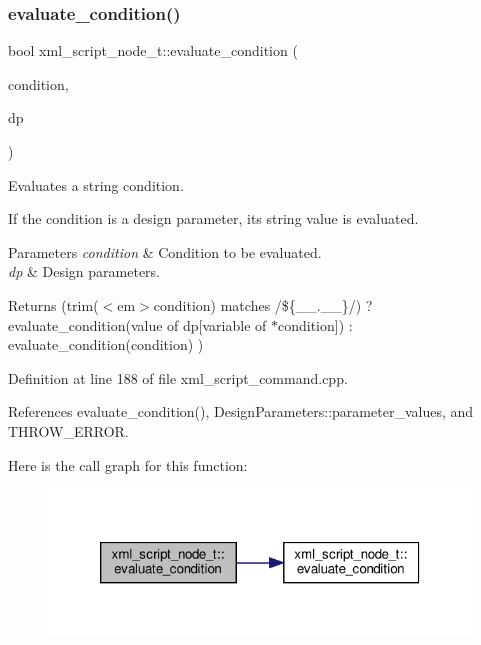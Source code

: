 \subsubsection{\texorpdfstring{evaluate\+\_\+condition()}{evaluate\_condition()}\hspace{0.1cm}{\footnotesize\ttfamily [2/2]}}
{\footnotesize\ttfamily bool xml\+\_\+script\+\_\+node\+\_\+t\+::evaluate\+\_\+condition (\begin{DoxyParamCaption}\item[{const std\+::string $\ast$}]{condition,  }\item[{const \hyperlink{DesignParameters_8hpp_ae36bb1c4c9150d0eeecfe1f96f42d157}{Design\+Parameters\+Ref} \&}]{dp }\end{DoxyParamCaption})\hspace{0.3cm}{\ttfamily [static]}}



Evaluates a string condition. 

If the condition is a design parameter, its string value is evaluated. 
\begin{DoxyParams}{Parameters}
{\em condition} & Condition to be evaluated. \\
\hline
{\em dp} & Design parameters. \\
\hline
\end{DoxyParams}
\begin{DoxyReturn}{Returns}
(trim($<$em$>$condition) matches /\$\{\+\_\+\+\_\+.\+\_\+\+\_\+\}/) ? evaluate\+\_\+condition(value of dp\mbox{[}variable of $\ast$condition\mbox{]}) \+: evaluate\+\_\+condition(condition) ) 
\end{DoxyReturn}


Definition at line 188 of file xml\+\_\+script\+\_\+command.\+cpp.



References evaluate\+\_\+condition(), Design\+Parameters\+::parameter\+\_\+values, and T\+H\+R\+O\+W\+\_\+\+E\+R\+R\+OR.

Here is the call graph for this function\+:
\nopagebreak
\begin{figure}[H]
\begin{center}
\leavevmode
\includegraphics[width=320pt]{d6/de5/classxml__script__node__t_ad27af696d98812f71634159dd6f5052c_cgraph}
\end{center}
\end{figure}
\mbox{\label{classxml__script__node__t_aca8e03906a47471b458570a203829aa3}} 

